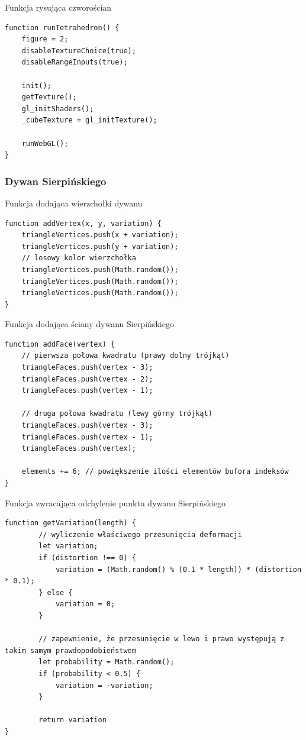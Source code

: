 \documentclass[12pt,a4paper,titlepage]{article}
\begin{document}
\begin{listing}[H]
\caption{Funkcja rysująca czworościan}
\begin{verbatim}
function runTetrahedron() {
    figure = 2;
    disableTextureChoice(true);
    disableRangeInputs(true);

    init();
    getTexture();
    gl_initShaders();
    _cubeTexture = gl_initTexture();
    
    runWebGL();
}
\end{verbatim}
\end{listing}

\subsubsection{Dywan Sierpińskiego}

\begin{listing}[H]
\caption{Funkcja dodająca wierzchołki dywanu}
\begin{verbatim}
function addVertex(x, y, variation) {
    triangleVertices.push(x + variation);
    triangleVertices.push(y + variation);
    // losowy kolor wierzchołka
    triangleVertices.push(Math.random());
    triangleVertices.push(Math.random());
    triangleVertices.push(Math.random());
}
\end{verbatim}
\end{listing}



\begin{listing}[H]
\caption{Funkcja dodająca ściany dywanu Sierpińskiego}
\begin{verbatim}
function addFace(vertex) {
    // pierwsza połowa kwadratu (prawy dolny trójkąt)
    triangleFaces.push(vertex - 3);
    triangleFaces.push(vertex - 2);
    triangleFaces.push(vertex - 1);

    // druga połowa kwadratu (lewy górny trójkąt)
    triangleFaces.push(vertex - 3);
    triangleFaces.push(vertex - 1);
    triangleFaces.push(vertex);

    elements += 6; // powiększenie ilości elementów bufora indeksów
}
\end{verbatim}
\end{listing}

\begin{listing}[H]
\caption{Funkcja zwracająca odchylenie punktu dywanu Sierpińskiego}
\begin{verbatim}
function getVariation(length) {
        // wyliczenie właściwego przesunięcia deformacji
        let variation;
        if (distortion !== 0) {
            variation = (Math.random() % (0.1 * length)) * (distortion * 0.1);
        } else {
            variation = 0;
        }
        
        // zapewnienie, że przesunięcie w lewo i prawo występują z takim samym prawdopodobieństwem
        let probability = Math.random();
        if (probability < 0.5) {
            variation = -variation;
        }

        return variation
}
\end{verbatim}
\end{listing}
\end{document}
